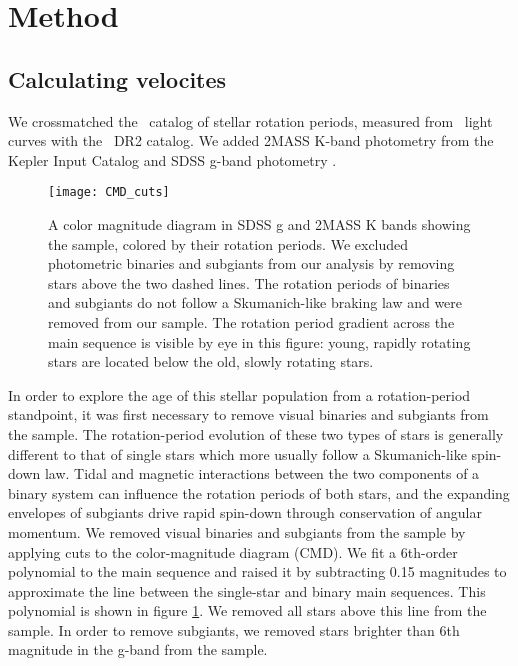\section{Method}

\subsection{Calculating velocites}

We crossmatched the \mct\ catalog of stellar rotation periods, measured from
\kepler\ light curves with the \gaia\ DR2 catalog.
We added 2MASS K-band photometry from the Kepler Input Catalog
\citep{brown2011} and SDSS g-band photometry .

\begin{figure}
  \caption{
A color magnitude diagram in SDSS g and 2MASS K bands showing the
\citet{mcquillan2014} sample, colored by their rotation periods.
We excluded photometric binaries and subgiants from our analysis by removing
stars above the two dashed lines.
The rotation periods of binaries and subgiants do not follow a Skumanich-like
braking law and were removed from our sample.
The rotation period gradient across the main sequence is visible by eye in
    this figure: young, rapidly rotating stars are located below the old,
    slowly rotating stars.
}
  \centering
    \texttt{[image: CMD\_cuts]}
\label{fig:CMD_cuts}
\end{figure}

In order to explore the age of this stellar population from a rotation-period
standpoint, it was first necessary to remove visual binaries and subgiants
from the sample.
The rotation-period evolution of these two types of stars is generally
different to that of single stars which more usually follow a Skumanich-like
spin-down law.
Tidal and magnetic interactions between the two components of a binary system
can influence the rotation periods of both stars, and the expanding envelopes
of subgiants drive rapid spin-down through conservation of angular momentum.
We removed visual binaries and subgiants from the sample by applying cuts to
the color-magnitude diagram (CMD).
We fit a 6th-order polynomial to the main sequence and raised it by
subtracting 0.15 magnitudes to approximate the line between the single-star
and binary main sequences.
This polynomial is shown in figure \ref{fig:CMD_cuts}.
We removed all stars above this line from the sample.
In order to remove subgiants, we removed stars brighter than 6th magnitude in
the g-band from the sample.

